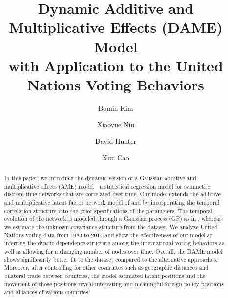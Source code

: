 \documentclass[a4paper]{article}
\title{Dynamic Additive and Multiplicative Effects (DAME) Model\\
	with Application to the United Nations Voting Behaviors}
\author[1]{Bomin Kim}
\author[1]{Xiaoyue Niu}
\author[1]{David Hunter}
\author[2]{Xun Cao}
\affil[1]{Department of Statistics, The Pennsylvania State University}
\affil[2]{Department of Political Science, The Pennsylvania State University}
\date{}
\begin{document}
	\maketitle
	\begin{abstract}
		\noindent  
		In this paper, we introduce the dynamic version of a Gaussian additive and multiplicative effects (AME) model---a statistical regression model for symmetric discrete-time networks that are correlated over time. Our model extends the additive and multiplicative latent factor network model of \cite{hoff2009multiplicative} and \cite{minhas2016inferential} by incorporating the temporal correlation structure into the prior specifications of the parameters. The temporal evolution of the network is modeled through a Gaussian process (GP) as in \cite{durante2013nonparametric}, whereas we estimate the unknown covariance structure from the dataset. We analyze United Nations voting data from 1983 to 2014 \citep{12379_2016} and show the effectiveness of our model at inferring the dyadic dependence structure among the international voting behaviors as well as allowing for a changing number of nodes over time. Overall, the DAME model shows significantly better fit to the dataset compared to the alternative approaches. Moreover, after controlling for other covariates such as geographic distances and bilateral trade between countries, the model-estimated latent positions and the movement of those positions reveal interesting and meaningful foreign policy positions and alliances of various countries. 
	\end{abstract}
\end{document}
